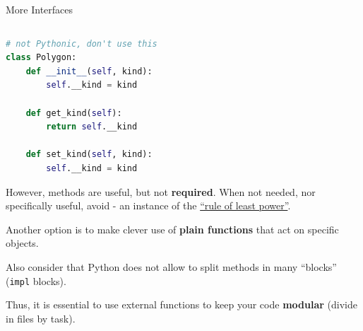 \documentclass[9pt]{beamer}
\begin{document}
\begin{frame}[fragile]{More Interfaces}
\begin{columns}
\begin{column}{0.5\textwidth}
\begin{lstlisting}[language=Python,style=mystyle]
# not Pythonic, don't use this
class Polygon:
    def __init__(self, kind):
        self.__kind = kind

    def get_kind(self):
        return self.__kind
 
    def set_kind(self, kind):
        self.__kind = kind\end{lstlisting}

            However, methods are useful, but not \textbf{required}.
            When not needed, nor specifically useful, avoid - an instance of
            the
            \href{https://en.wikipedia.org/wiki/Rule_of_least_power}{\enquote{rule
            of least power}}.\newline

            Another option is to make clever use of \textbf{plain functions}
            that act on specific objects.
            \begin{flushright}
                \footnotesize
                \hspace*{15em}Also consider that Python does not allow to split
                methods in many \enquote{blocks} (\texttt{impl} blocks).

                \hspace*{15em}Thus, it is essential to use external functions to
                keep your code \textbf{modular} (divide in files by task).
            \end{flushright}
        \end{column}
    \end{columns}
\end{frame}
\end{document}

